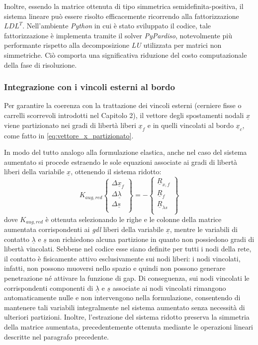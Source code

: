 Inoltre, essendo la matrice ottenuta di tipo simmetrica semidefinita-positiva, il sistema lineare può essere risolto efficacemente ricorrendo alla fattorizzazione $LDL^T$. Nell'ambiente \textit{Python} in cui è stato sviluppato il codice, tale fattorizzazione è implementa tramite il solver \textit{PyPardiso}, notevolmente più performante rispetto alla decomposizione \textit{LU} utilizzata per matrici non simmetriche. Ciò comporta una significativa riduzione del costo computazionale della fase di risoluzione.

\subsubsection{Integrazione con i vincoli esterni al bordo}
Per garantire la coerenza con la trattazione dei vincoli esterni (cerniere fisse o carrelli scorrevoli introdotti nel Capitolo 2), il vettore degli spostamenti nodali $\underline{x}$ viene partizionato nei gradi di libertà liberi $\underline{x}_f$ e in quelli vincolati al bordo $\underline{x}_c$, come fatto in \eqref{eq:vettore_x_partizionato}.

In modo del tutto analogo alla formulazione elastica, anche nel caso del sistema aumentato si procede estraendo le sole equazioni associate ai gradi di libertà liberi della variabile $\underline{x}$, ottenendo il sistema ridotto:
\begin{equation}
  K_{aug,red}\left\{
  \begin{array}{c}
    \Delta\underline{x}_f\\
    \Delta\underline{\lambda}\\
    \Delta\underline{s}\\
  \end{array}\right\} = - \left\{
  \begin{array}{c}
    \underline{R}_{x,f}\\
    \underline{R}_f\\
    \underline{R}_{\lambda s}\\
  \end{array}\right\}
\end{equation}
dove $K_{aug,red}$ è ottenuta selezionando le righe e le colonne della matrice aumentata corrispondenti ai \textit{gdl} liberi della variabile $\underline{x}$, mentre le variabili di contatto $\underline{\lambda}$ e $\underline{s}$ non richiedono alcuna partizione in quanto non possiedono gradi di libertà vincolati. Sebbene nel codice esse siano definite per tutti i nodi della rete, il contatto è fisicamente attivo esclusivamente sui nodi liberi: i nodi vincolati, infatti, non possono muoversi nello spazio e quindi non possono generare penetrazione né attivare la funzione di gap. Di conseguenza, sui nodi vincolati le corrispondenti componenti di $\underline{\lambda}$ e $\underline{s}$ associate ai nodi vincolati rimangono automaticamente nulle e non intervengono nella formulazione, consentendo di mantenere tali variabili integralmente nel sistema aumentato senza necessità di ulteriori partizioni. Inoltre, l'estrazione del sistema ridotto preserva la simmetria della matrice aumentata, precedentemente ottenuta mediante le operazioni lineari descritte nel paragrafo precedente.   


